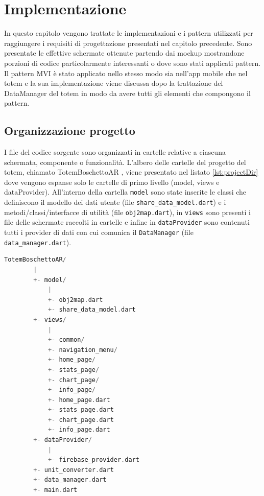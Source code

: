 \chapter{Implementazione}
In questo capitolo vengono trattate le implementazioni e i pattern utilizzati per raggiungere i requisiti di progettazione presentati nel capitolo precedente. Sono presentate le effettive schermate ottenute partendo dai mockup mostrandone porzioni di codice particolarmente interessanti o dove sono stati applicati pattern. Il pattern MVI è stato applicato nello stesso modo sia nell'app mobile che nel totem e la sua implementazione viene discussa dopo la trattazione del DataManager del totem in modo da avere tutti gli elementi che compongono il pattern.

\section{Organizzazione progetto}
I file del codice sorgente sono organizzati in cartelle relative a ciascuna schermata, componente o funzionalità. L'albero delle cartelle del progetto del totem, chiamato TotemBoschettoAR \cite{repoTotemBoschettoAR}, viene presentato nel listato \ref{lst:projectDir} dove vengono espanse solo le cartelle di primo livello (model, views e dataProvider). All'interno della cartella \texttt{model} sono state inserite le classi che definiscono il modello dei dati utente (file \texttt{share\_data\_model.dart}) e i metodi/classi/interfacce di utilità (file \texttt{obj2map.dart}), in \texttt{views} sono presenti i file delle schermate raccolti in cartelle e infine in \texttt{dataProvider} sono contenuti tutti i provider di dati con cui comunica il \texttt{DataManager} (file \texttt{data\_manager.dart}).

\begin{lstlisting}[language=C, caption={Albero della directory del progetto TotemBoschettoAR}, label={lst:projectDir}]
    TotemBoschettoAR/
        |
        +- model/
            |
            +- obj2map.dart
            +- share_data_model.dart
        +- views/
            |
            +- common/
            +- navigation_menu/
            +- home_page/
            +- stats_page/
            +- chart_page/
            +- info_page/
            +- home_page.dart
            +- stats_page.dart
            +- chart_page.dart
            +- info_page.dart
        +- dataProvider/
            |
            +- firebase_provider.dart
        +- unit_converter.dart
        +- data_manager.dart
        +- main.dart
\end{lstlisting}

